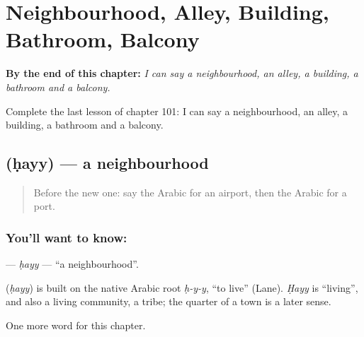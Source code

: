 
\chapter{Neighbourhood, Alley, Building, Bathroom, Balcony}
\label{ch:ar-neighbourhood-alley-building-bathroom-balcony}

\begin{chapteropening}
\textbf{By the end of this chapter:} \emph{I can say a neighbourhood, an alley, a building, a bathroom and a balcony.}

Complete the last lesson of chapter 101: I can say a neighbourhood, an alley, a building, a bathroom and a balcony.
\end{chapteropening}

\section[\texorpdfstring{\ar{حي} (ḥayy)}{حي (ḥayy)}]{ (ḥayy) — a neighbourhood}

\label{lesson:AR-C101-hayy}



\begin{quote}
Before the new one: say the Arabic for an airport, then the Arabic for a port.
\end{quote}

\subsection*{You'll want to know: }
\textbf{} — \emph{ḥayy} — \textquotedblleft{}a neighbourhood\textquotedblright{}.

\begin{cousinweb}
\textbf{} (\emph{ḥayy}) is built on the native Arabic root \emph{ḥ-y-y}, \textquotedblleft{}to live\textquotedblright{} (Lane). \emph{Ḥayy} is \textquotedblleft{}living\textquotedblright{}, and also a living community, a tribe; the quarter of a town is a later sense.
\end{cousinweb}

\begin{grammarlens}[title={What you've built}]
One more word for this chapter.
\end{grammarlens}

